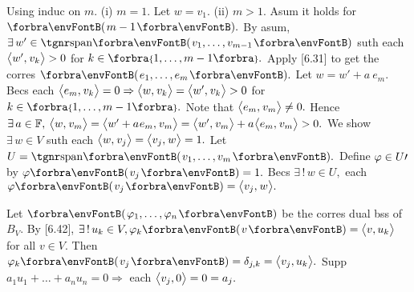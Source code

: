 Using induc on $m.$ (i) $m=1.$ Let $w=v_1.$ (ii) $m>1.$ Asum it holds for $\Par{m-1}.$\parSol{}
By asum, $\exists\,w'\in\Span{v_1,\dots,v_{m-1}}$ suth each $\big\langle{}w',\:\!v_k{}\big\rangle>0$ for $k\in\Bra{1,\dots,m-1}.$\parSol{}
Apply [6.31] to get the corres $\Par{e_1,\dots,e_m}.$ \;Let $w=w'+a\:\!e_m.$\parSol{}
Becs each $\big\langle{}e_m,\:\!v_k{}\big\rangle=0\Rightarrow\big\langle{}w,\:\!v_k{}\big\rangle=\big\langle{}w',\:\!v_k{}\big\rangle>0$ for $k\in\Bra{1,\dots,m-1}.$\parSol{}
Note that $\big\langle{}e_m,\:\!v_m{}\big\rangle\neq0.$ Hence $\exists\,a\in{\mathbb{F}},\:\big\langle{}w,\:\!v_m{}\big\rangle=\big\langle{}w'+a\:\!e_m,\:\!v_m{}\big\rangle=\big\langle{}w',\:\!v_m{}\big\rangle+a\:\!\big\langle{}e_m,\:\!v_m{}\big\rangle>0.$\PfEnd\vspace{4pt}\parSol{}
\Or We show $\exists\,w\in V$ suth each $\big\langle{}w,\:\!v_j{}\big\rangle=\big\langle{}v_j,\:\!w{}\big\rangle=1.$ Let $U=\Span{v_1,\dots,v_m}.$\parSol{}
Define $\varphi\in U\prime$ by $\varphi\Par{v_j}=1.$ Becs $\exists\,!\,w\in U,$ each $\varphi\Par{v_j}=\Ang{v_j,\:\!w}.$\PfEnd
\SepLine

Let $\Par{\varphi_1,\dots,\varphi_n}$ be the corres dual bss of $B_V.$ By [6.42], $\exists\,!\,u_k\in V,\varphi_k\Par{v}=\Ang{v,u_k}$ for all $v\in V.$\parSol{}
Then $\varphi_k\Par{v_j}=\delta_{j,k}=\Ang{v_j,u_k}.$ Supp $a_1u_1+\dots+a_nu_n=0\Rightarrow$ each $\big\langle{}v_j,0{}\big\rangle=0=a_j.$\PfEnd
\SepLine

